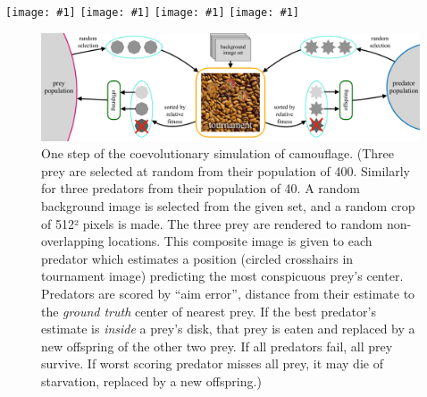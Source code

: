 \documentclass[sigconf]{acmart}
\newcommand{\jargon}[1]{\textit{#1}}
\newcommand{\igfour}[1]{\texttt{[image: \#1]}}
\begin{document}
\begin{teaserfigure}
    \igfour{20221121_1819_step_6464.png}
    \hfill
    \igfour{20221108_2018_step_6562.png}
    \hfill
    \igfour{20221215_step_7182.png}
    \hfill
    \igfour{20221216_step_5997.png}
    \caption{Photographs of natural textures, each overlaid with three camouflaged \jargon{prey}. The prey are randomly placed 2D disks, each with its own evolved camouflage texture. (Zoom in for detail, disk diameter is 20\% of image width. Images of: plum leaf litter, tree and sky, gravel, oxalis sprouts. For more examples see: \citet{reynolds_coevolution_2023}.)}
    \label{fig:teaser}
    \vspace{3mm} %
\end{teaserfigure}

\maketitle


\begin{figure}
    \includegraphics[width=\textwidth]{coc_overview.pdf}
    \caption{One step of the coevolutionary simulation of camouflage. \footnotesize (Three prey are selected at random from their population of 400. Similarly for three predators from their population of 40. A random background image is selected from the given set, and a random crop of 512² pixels is made. The three prey are rendered to random non-overlapping locations. This composite image is given to each predator which estimates a position (circled crosshairs in tournament image) predicting the most conspicuous prey's center. Predators are scored by “aim error”, distance from their estimate to the \jargon{ground truth} center of nearest prey. If the best predator's estimate is \textit{inside} a prey's disk, that prey is eaten and replaced by a new offspring of the other two prey. If all predators fail, all prey survive. If worst scoring predator misses all prey, it may die of starvation, replaced by a new offspring.)}
    \label{fig:simulation_overview}
\end{figure}
\end{document}
